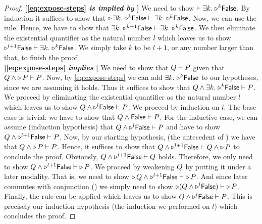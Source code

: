 \begin{proof}
{\bfseries [\eqref{eq:expose-steps} \emph{is implied by} ]}
We need to show $\vdash \exists k.\; {\mathop{{\triangleright}}}^{k} \textsf{\upshape False}$.
By  induction it suffices to show that $\mathop{{\triangleright}} \exists k.\; {\mathop{{\triangleright}}}^{k} \textsf{\upshape False} \vdash \exists k.\; {\mathop{{\triangleright}}}^{k} \textsf{\upshape False}$.
Now, we can use the  rule.
Hence, we have to show that $\exists k.\; {\mathop{{\triangleright}}}^{k+1} \textsf{\upshape False} \vdash \exists k.\; {\mathop{{\triangleright}}}^{k} \textsf{\upshape False}$.
We then eliminate the existential quantifier as the natural number $l$ which leaves us to show ${\mathop{{\triangleright}}}^{l+1} \textsf{\upshape False} \vdash \exists k.\; {\mathop{{\triangleright}}}^{k} \textsf{\upshape False}$.
We simply take $k$ to be $l + 1$, or any number larger than that, to finish the proof.\\

\noindent
{\bfseries [\eqref{eq:expose-steps} \emph{implies} ]}
We need to show that $Q \vdash P$ given that $Q \land \mathop{{\triangleright}} P \vdash P$.
Now, by \eqref{eq:expose-steps} we can add $\exists k.\; {\mathop{{\triangleright}}}^{k} \textsf{\upshape False}$ to our hypotheses, since we are assuming it holds.
Thus it suffices to show that $Q \land \exists k.\; {\mathop{{\triangleright}}}^{k} \textsf{\upshape False} \vdash P$.
We proceed by eliminating the existential quantifier as the natural number $l$ which leaves us to show $Q \land {\mathop{{\triangleright}}}^{l} \textsf{\upshape False} \vdash P$.
We proceed by induction on $l$.
The base case is trivial: we have to show that $Q \land \textsf{\upshape False} \vdash P$.
For the inductive case, we can assume (induction hypothesis) that $Q \land {\mathop{{\triangleright}}}^{l} \textsf{\upshape False} \vdash P$ and have to show $Q \land {\mathop{{\triangleright}}}^{l+1} \textsf{\upshape False} \vdash P$.
Now, by our starting hypothesis, (the antecedent of ) we have that $Q \land \mathop{{\triangleright}} P \vdash P$.
Hence, it suffices to show that $Q \land {\mathop{{\triangleright}}}^{l+1} \textsf{\upshape False} \vdash Q \land \mathop{{\triangleright}} P$ to conclude the proof.
Obviously, $Q \land {\mathop{{\triangleright}}}^{l+1} \textsf{\upshape False} \vdash Q$ holds.
Therefore, we only need to show $Q \land {\mathop{{\triangleright}}}^{l+1} \textsf{\upshape False} \vdash \mathop{{\triangleright}} P$.
We proceed by weakening $Q$ by putting it under a later modality.
That is, we need to show $\mathop{{\triangleright}} Q \land {\mathop{{\triangleright}}}^{l+1} \textsf{\upshape False} \vdash \mathop{{\triangleright}} P$.
And since later commutes with conjunction () we simply need to show $\mathop{{\triangleright}} (Q \land {\mathop{{\triangleright}}}^{l} \textsf{\upshape False}) \vdash \mathop{{\triangleright}} P$.
Finally, the  rule can be applied which leaves us to show $Q \land {\mathop{{\triangleright}}}^{l} \textsf{\upshape False} \vdash P$.
This is precisely our induction hypothesis (the induction we performed on $l$) which concludes the proof.
\end{proof}

